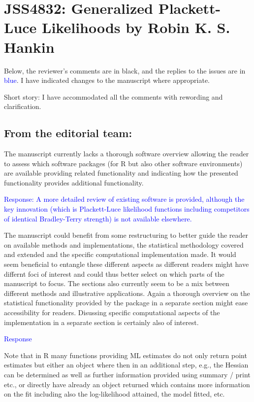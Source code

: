 \documentclass[12pt]{article}
\begin{document}
\section*{JSS4832: Generalized Plackett-Luce Likelihoods by Robin
K. S. Hankin}


Below, the reviewer's comments are in black, and the replies to the
issues are in \textcolor{blue}{blue}.  I have indicated changes to
the manuscript where appropriate.

Short story: I have accommodated all the comments with rewording and
clarification.

\subsection*{From the editorial team:}

The manuscript currently lacks a thorough software overview allowing
the reader to assess which software packages (for R but also other
software environments) are available providing related functionality
and indicating how the presented functionality provides additional
functionality.

\textcolor{blue}{Response: A more detailed review of existing software
  is provided, although the key innovation (which is Plackett-Luce
  likelihood functions including competitors of identical
  Bradley-Terry strength) is not available elsewhere.}

The manuscript could benefit from some restructuring to better guide
the reader on available methods and implementations, the statistical
methodology covered and extended and the specific computational
implementation made.  It would seem beneficial to entangle these
different aspects as different readers might have differnt foci of
interest and could thus better select on which parts of the manuscript
to focus.  The sections also currently seem to be a mix between
different methods and illustrative applications. Again a thorough
overview on the statistical functionality provided by the package in a
separate section might ease accessibility for readers. Disussing
specific computational aspects of the implementation in a separate
section is certainly also of interest.

\textcolor{blue}{Response}


Note that in R many functions providing ML estimates do not only
return point estimates but either an object where then in an
additional step, e.g., the Hessian can be determined as well as
further information provided using summary / print etc., or directly
have already an object returned which contains more information on the
fit including also the log-likelihood attained, the model fitted, etc.
\end{document}
